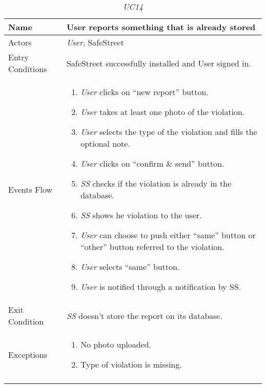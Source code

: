 \documentclass[../../../RASD.tex]{subfiles}
\begin{document}
\begin{center}
\begin{longtable}{| p{.35\linewidth} | p{.65\linewidth} |}
\hline
\textbf{Name} & \textbf{User reports something that is already stored}\\ \hline
Actors & \textit{User}, SafeStreet\\ \hline
Entry Conditions & SafeStreet successfully installed and User signed in.\\ \hline
Events Flow &
\begin{enumerate}
\item \textit{User} clicks on “new report” button.
\item \textit{User} takes at least one photo of the violation.
\item \textit{User} selects the type of the violation and fills the optional note.
\item \textit{User} clicks on “confirm \& send” button.
\item \textit{ SS} checks if the violation is already in the database.
\item \textit{SS} shows he violation to the user.
    \item \textit{User} can choose to push either “same” button or “other” button referred to the violation.
    \item \textit{User} selects “same” button.
    \item \textit{User} is notified through a notification by SS.
\end{enumerate}
\\ \hline
Exit Condition & \textit{SS} doesn't store the report on its database.\\ \hline
Exceptions &
\begin{enumerate}
\item No photo uploaded.
    \item Type of violation is missing.
\end{enumerate}
\\
\hline
\caption{\textit{UC14}}
\end{longtable}
\end{center}
\end{document}
